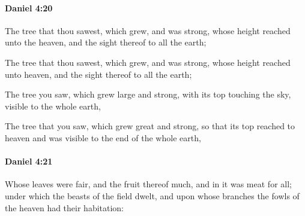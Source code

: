 		\paragraph{Daniel 4:20} %
			\label{DANIEL-4-20}

			The tree that thou sawest, which grew, and was strong, whose height reached unto the heaven, and the sight thereof to all the earth;

			\begin{versebox}
					\item[BHS] 
					\item[LXX] 
					\item[ASV] The tree that thou sawest, which grew, and was strong, whose height reached unto heaven, and the sight thereof to all the earth;
					\item[NIV] The tree you saw, which grew large and strong, with its top touching the sky, visible to the whole earth,
					\item[NRSV] The tree that you saw, which grew great and strong, so that its top reached to heaven and was visible to the end of the whole earth,
			\end{versebox}

		\paragraph{Daniel 4:21} %
			\label{DANIEL-4-21}

			Whose leaves were fair, and the fruit thereof much, and in it was meat for all; under which the beasts of the field dwelt, and upon whose branches the fowls of the heaven had their habitation:

